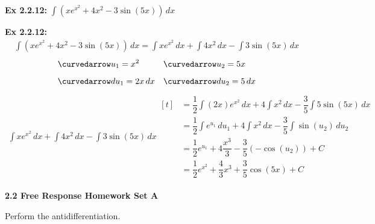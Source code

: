\begin{tcolorbox}[example]
    \textbf{Ex 2.2.12: } $\int \left(xe^{x^2} + 4x^2 - 3\sin (5x)\right) \, dx$
\end{tcolorbox}
\begin{tcolorbox}[solution]
    \textbf{Ex 2.2.12: } \begin{align*}
        \int \left(xe^{x^2} + 4x^2 - 3\sin (5x)\right) \, dx = \int xe^{x^2} \,dx + \int 4x^2 \, dx - \int 3\sin (5x) \,dx
    \end{align*} \vspace{-11pt} \begin{align*}
        &\curvedarrow u_1 = x^2 && \curvedarrow u_2 = 5x \\[5.5pt]
        &\curvedarrow du_1 = 2x \, dx && \curvedarrow du_2 = 5 \, dx
    \end{align*} \vspace{-11pt} \begin{align*}
        \int xe^{x^2} \, dx + \int 4x^2 \, dx - \int 3\sin (5x) \, dx \begin{aligned}[t]
            & = \dfrac{1}{2}\int (2x)e^{x^2} \, dx + 4\int x^2 \, dx - \dfrac{3}{5}\int 5\sin(5x) \, dx \\[11pt]
            & = \dfrac{1}{2}\int e^{u_1} \, du_1 + 4\int x^2 \, dx - \dfrac{3}{5}\int \sin \left(u_2\right) \, du_2 \\[11pt]
            & = \dfrac{1}{2}e^{u_1} + 4\dfrac{x^3}{3} - \dfrac{3}{5}(-\cos (u_2)) + C \\[11pt]
            & = \boxed{\dfrac{1}{2}e^{x^2} + \dfrac{4}{3}x^3 + \dfrac{3}{5}\cos (5x) + C}
        \end{aligned}
    \end{align*}
\end{tcolorbox} 

\newpage

\textbf{\large{2.2 Free Response Homework Set A}} \par

Perform the antidifferentiation. \par

